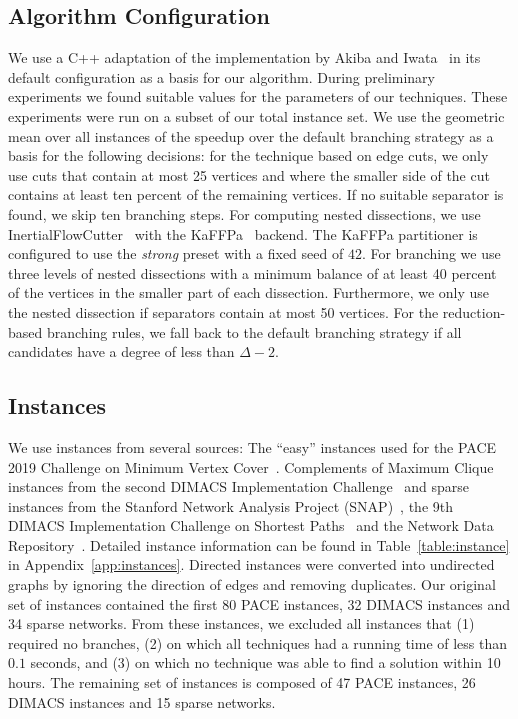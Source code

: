 \documentclass[a4paper,UKenglish,cleveref, autoref, thm-restate]{lipics-v2021}
\begin{document}
\subsection{Algorithm Configuration}\label{sec:algo_conf}
We use a C++ adaptation of the implementation by Akiba and
Iwata~\cite{AkibaIwata} in its default configuration as a basis for our algorithm. During preliminary experiments we found
suitable values for the parameters of
our techniques. These experiments were run on a subset of our total instance
set. We use the geometric mean over all instances of the speedup over the
default branching strategy as a basis for the following decisions: for the technique based on
edge cuts, we only use cuts that contain at most 25 vertices and where the smaller side of
the cut contains at least ten percent of the remaining vertices. If no suitable separator is found, we skip ten branching steps. For computing nested dissections, we use 
InertialFlowCutter~\cite{gottesburen2019faster}
with the KaFFPa~\cite{DBLP:conf/wea/SandersS13}
backend. The KaFFPa partitioner is configured to use the \emph{strong} preset
with a fixed seed of $42$. For branching we use
three levels of nested dissections with a minimum balance of at least 40 percent of the vertices in the smaller part of each dissection. Furthermore, we
only use the nested dissection if separators contain at most
50 vertices. For the reduction-based
branching rules, we fall back to the default branching strategy if all
candidates have a degree of less than $\Delta - 2$. 

\subsection{Instances}
We use instances from several sources: The ``easy'' instances used for the
PACE 2019 Challenge on Minimum Vertex Cover~\cite{dzulfikar_et_al:LIPIcs:2019:11486}. 
Complements of Maximum Clique instances from the second DIMACS Implementation Challenge~\cite{johnson1993cliques} and sparse instances from
the Stanford Network Analysis Project (SNAP)~\cite{snapnets}, the 9th DIMACS
Implementation Challenge on Shortest Paths~\cite{demetrescu2009shortest} and the
Network Data Repository~\cite{nr}. Detailed instance information can
be found in Table~\ref{table:instance} in Appendix~\ref{app:instances}. Directed instances were converted into
undirected graphs by ignoring the direction of edges and removing duplicates.
Our original set of instances contained the first 80 PACE instances, 32 DIMACS instances and 34 sparse networks.
From these instances, we excluded all instances that (1) required no branches, (2) on which all techniques had a running time of less than $0.1$ seconds, and (3) on which no technique was able to find a solution within 10 hours.
The remaining set of instances is composed of 47 PACE instances, 26 DIMACS instances and 15 sparse networks.
\end{document}
